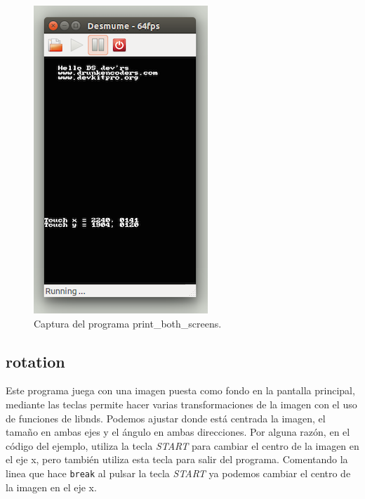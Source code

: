 \documentclass[12pt,english]{article}
\begin{document}
    \begin{figure}[H] 
    \centering
    \includegraphics[scale=0.5]{p3Media/print_both_screens}
    \caption{Captura del programa print\_both\_screens.}
    \end{figure}

    \newpage

    \subsection{rotation}

    Este programa juega con una imagen puesta como fondo en la pantalla principal, mediante las teclas permite hacer varias transformaciones de la imagen con el uso de funciones de libnds. Podemos ajustar donde está centrada la imagen, el tamaño en ambas ejes y el ángulo en ambas direcciones. Por alguna razón, en el código del ejemplo, utiliza la tecla \emph{START} para cambiar el centro de la imagen en el eje x, pero también utiliza esta tecla para salir del programa. Comentando la linea que hace \texttt{break} al pulsar la tecla \emph{START} ya podemos cambiar el centro de la imagen en el eje x.
\end{document}
